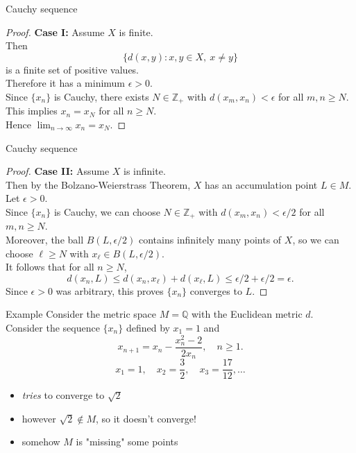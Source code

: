 \documentclass{beamer}
\begin{document}
\begin{frame}{Cauchy sequence}
\begin{proof}
\textbf{Case I:} Assume $X$ is finite.\\
\pause
Then
$$\{d(x,y): x,y\in X,\ x\neq y\}$$
is a finite set of positive values.\\
\pause
Therefore it has a minimum $\epsilon > 0$.\\
\pause
Since $\{x_n\}$ is Cauchy, there exists $N\in\mathbb{Z}_+$ with $d(x_m,x_n) < \epsilon$ for all $m,n \geq N$.\\
\pause
This implies $x_n = x_N$ for all $n\geq N$.\\
\pause
Hence $\lim_{n\rightarrow\infty} x_n = x_N$.
\end{proof}
\end{frame}

\begin{frame}{Cauchy sequence}
\begin{proof}
\textbf{Case II:} Assume $X$ is infinite.\\
\pause
Then by the Bolzano-Weierstrass Theorem, $X$ has an accumulation point $L\in M$.\\
\pause
Let $\epsilon > 0$.\\
\pause
Since $\{x_n\}$ is Cauchy, we can choose $N\in\mathbb{Z}_+$ with $d(x_m,x_n) < \epsilon/2$ for all $m,n\geq N$.\\
\pause
Moreover, the ball $B(L,\epsilon /2)$ contains infinitely many points of $X$, so we can choose $\ell\geq N$ with $x_\ell\in B(L,\epsilon/2)$.\\
\pause
It follows that for all $n\geq N$,
$$d(x_n,L)\leq d(x_n,x_\ell) + d(x_\ell,L) \leq \epsilon/2 + \epsilon/2 = \epsilon.$$
\pause
Since $\epsilon > 0$ was arbitrary, this proves $\{x_n\}$ converges to $L$.
\end{proof}
\end{frame}

\begin{frame}{Example}
Consider the metric space $M=\mathbb{Q}$ with the Euclidean metric $d$.\\
\pause
Consider the sequence $\{x_n\}$ defined by $x_1 = 1$ and
$$x_{n+1} = x_n - \frac{x_n^2-2}{2x_n},\quad n\geq 1.$$
\pause
$$x_1 = 1,\quad x_2 = \frac{3}{2},\quad x_3 = \frac{17}{12},\dots$$
\begin{itemize}
\pause
\item \emph{tries} to converge to $\sqrt{2}$
\pause
\item however $\sqrt{2}\notin M$, so it doesn't converge!
\pause
\item somehow $M$ is "missing" some points
\end{itemize}
\end{frame}
\end{document}
